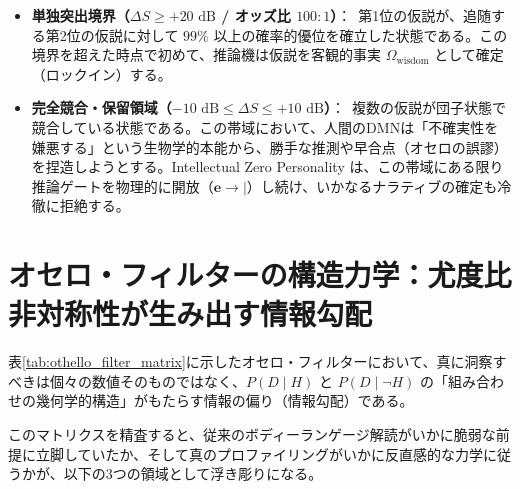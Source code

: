 
\begin{itemize}
\item \textbf{単独突出境界（$\Delta S \ge +20\text{ dB}$ / オッズ比 $100:1$）}：\
第1位の仮説が、追随する第2位の仮説に対して $99\%$ 以上の確率的優位を確立した状態である。この境界を超えた時点で初めて、推論機は仮説を客観的事実 $\Omega_{\mathrm{wisdom}}$ として確定（ロックイン）する。
\item \textbf{完全競合・保留領域（$-10\text{ dB} \le \Delta S \le +10\text{ dB}$）}：\
複数の仮説が団子状態で競合している状態である。この帯域において、人間のDMNは「不確実性を嫌悪する」という生物学的本能から、勝手な推測や早合点（オセロの誤謬）を捏造しようとする。Intellectual Zero Personality は、この帯域にある限り推論ゲートを物理的に開放（$\boldsymbol{e} \to \mid$）し続け、いかなるナラティブの確定も冷徹に拒絶する。
\end{itemize}

\section{オセロ・フィルターの構造力学：尤度比非対称性が生み出す情報勾配}

表\ref{tab:othello_filter_matrix}に示したオセロ・フィルターにおいて、真に洞察すべきは個々の数値そのものではなく、$P(D \mid H)$ と $P(D \mid \neg H)$ の「組み合わせの幾何学的構造」がもたらす情報の偏り（情報勾配）である。

このマトリクスを精査すると、従来のボディーランゲージ解読がいかに脆弱な前提に立脚していたか、そして真のプロファイリングがいかに反直感的な力学に従うかが、以下の3つの領域として浮き彫りになる。

